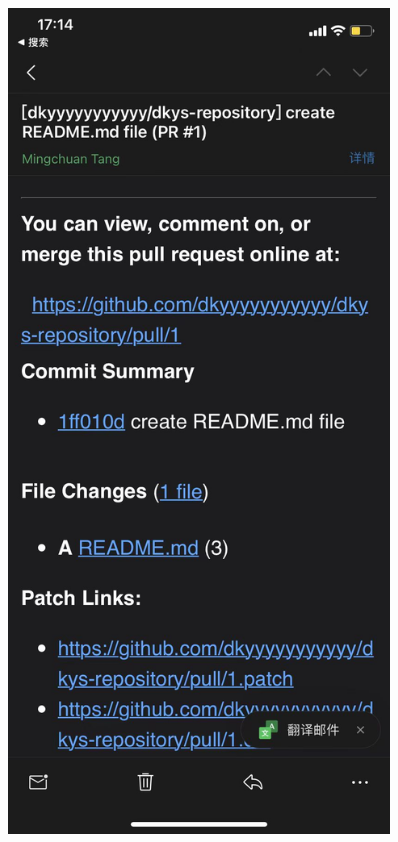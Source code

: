 \begin{enumerate}
\begin{figure}[ht]
              \begin{minipage}[c]{0.25\textwidth}
                  \centering
                  \includegraphics[width=0.9\textwidth]{image/git/github-pullrequest.jpg}
              \end{minipage}
              \begin{minipage}[c]{0.6\textwidth}

\end{minipage}
\end{figure}
\end{enumerate}
